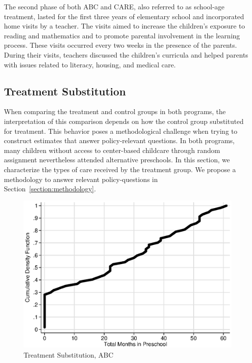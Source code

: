 \noindent The second phase of both ABC and CARE, also referred to as school-age treatment, lasted for the first three years of elementary school and incorporated home visits by a teacher. The visits aimed to increase the children's exposure to reading and mathematics and to promote parental involvement in the learning process. These visits occurred every two weeks in the presence of the parents. During their visits, teachers discussed the children's curricula and helped parents with issues related to literacy, housing, and medical care.\\

\subsection{Treatment Substitution}

\noindent When comparing the treatment and control groups in both programs, the interpretation of this comparison depends on how the control group substituted for treatment. This behavior poses a methodological challenge when trying to construct estimates that answer policy-relevant questions. In both programs, many children without access to center-based childcare through random assignment nevertheless attended alternative preschools. In this section, we characterize the types of care received by the treatment group. We propose a methodology to answer relevant policy-questions in Section~\ref{section:methodology}.\\

\begin{figure}[H]
		\caption{Treatment Substitution, ABC} \label{fig:treatsubabc}
		\includegraphics[width=.9\columnwidth]{output/abc_controlcontamination_months.eps}
\end{figure}

